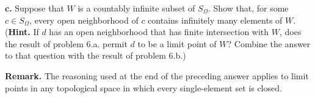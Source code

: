\documentclass{amsart}
\theoremstyle{plain}
\theoremstyle{definition}
\theoremstyle{remark}
\begin{document}
\vspace{.1in}
{\bfseries c.} Suppose that $W$ is a countably infinite subset of $S_{\Omega}$. Show that, for some $c\in S_{\Omega}$, every open neighborhood of $c$ contains infinitely many elements of $W$. ({\bf Hint.} If $d$ has an open neighborhood that has finite intersection with $W$, does the result of problem 6.a. permit $d$ to be a limit point of $W$? Combine the answer to that question with the result of problem 6.b.) 

\vspace{.1in}
{\bf Remark.} The reasoning used at the end of the preceding answer applies to limit points in any topological space in which every single-element set is closed. 


 
\end{document}
